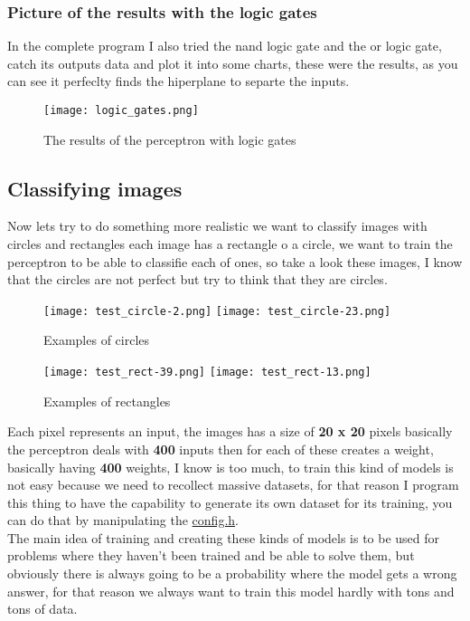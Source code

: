 \newpage
\subsubsection{Picture of the results with the logic gates}
In the complete program I also tried the nand logic gate and the or logic gate, catch its outputs
data and plot it into some charts, these were the results, as you can see  it perfeclty finds the
hiperplane to separte the inputs.
\begin{figure}[H]
  \centering
  \texttt{[image: logic\_gates.png]}
  \caption{The results of the perceptron with logic gates}
\end{figure}

\newpage
\subsection{Classifying images}
Now lets try to do something more realistic we want to classify images with circles and rectangles
each image has a rectangle o a circle, we want to train the perceptron to be able to classifie each
of ones, so take a look these images, I know that the circles are not perfect but try to think that
they are circles.

\begin{figure}[H]
  \centering
  \texttt{[image: test\_circle-2.png]}
  \texttt{[image: test\_circle-23.png]}
  \caption{Examples of circles}
\end{figure}

\begin{figure}[H]
  \centering
  \texttt{[image: test\_rect-39.png]}
  \texttt{[image: test\_rect-13.png]}
  \caption{Examples of rectangles}
\end{figure}
Each pixel represents an input, the images has a size of \textbf{20 x 20} pixels basically the perceptron
deals with \textbf{400} inputs then for each of these creates a weight, basically having
\textbf{400} weights, I know is too much, to train this kind of models is not easy because we
need to recollect massive datasets, for that reason I program this thing to have the capability to
generate its own dataset for its training, you can do that by manipulating the
\href{https://github.com/alecksandr26/machine-learning-code/blob/main/examples/perceptron_rectangle_circle/src/config.h}{config.h}.\\

The main idea of training and creating these kinds of models is to be used for problems where they
haven't been trained and be able to solve them, but obviously there is always going to be a
probability where the model gets a wrong answer, for that reason we always want to train this model
hardly with tons and tons of data.\\

